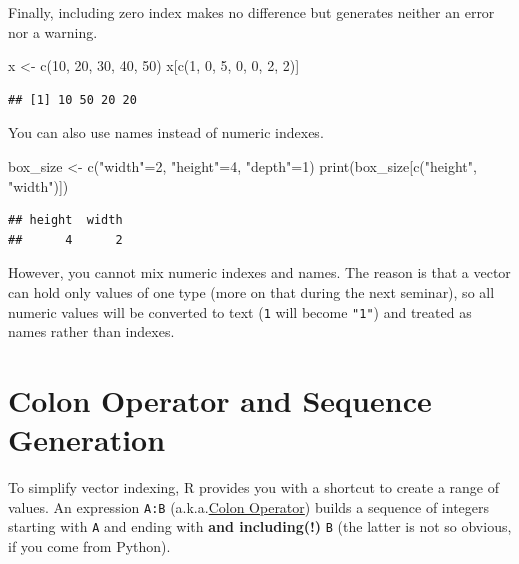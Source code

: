 \documentclass[
]{book}
\newenvironment{Shaded}{\begin{snugshade}}{\end{snugshade}}
\newcommand{\DecValTok}[1]{\textcolor[rgb]{0.00,0.00,0.81}{#1}}
\newcommand{\FunctionTok}[1]{\textcolor[rgb]{0.00,0.00,0.00}{#1}}
\newcommand{\NormalTok}[1]{#1}
\newcommand{\OtherTok}[1]{\textcolor[rgb]{0.56,0.35,0.01}{#1}}
\newcommand{\StringTok}[1]{\textcolor[rgb]{0.31,0.60,0.02}{#1}}
\begin{document}
Finally, including zero index makes no difference but generates neither an error nor a warning.

\begin{Shaded}
\begin{Highlighting}[]
\NormalTok{x }\OtherTok{\textless{}{-}} \FunctionTok{c}\NormalTok{(}\DecValTok{10}\NormalTok{, }\DecValTok{20}\NormalTok{, }\DecValTok{30}\NormalTok{, }\DecValTok{40}\NormalTok{, }\DecValTok{50}\NormalTok{)}
\NormalTok{x[}\FunctionTok{c}\NormalTok{(}\DecValTok{1}\NormalTok{, }\DecValTok{0}\NormalTok{, }\DecValTok{5}\NormalTok{, }\DecValTok{0}\NormalTok{, }\DecValTok{0}\NormalTok{, }\DecValTok{2}\NormalTok{, }\DecValTok{2}\NormalTok{)]}
\end{Highlighting}
\end{Shaded}

\begin{verbatim}
## [1] 10 50 20 20
\end{verbatim}

You can also use names instead of numeric indexes.

\begin{Shaded}
\begin{Highlighting}[]
\NormalTok{box\_size }\OtherTok{\textless{}{-}} \FunctionTok{c}\NormalTok{(}\StringTok{"width"}\OtherTok{=}\DecValTok{2}\NormalTok{, }\StringTok{"height"}\OtherTok{=}\DecValTok{4}\NormalTok{, }\StringTok{"depth"}\OtherTok{=}\DecValTok{1}\NormalTok{) }
\FunctionTok{print}\NormalTok{(box\_size[}\FunctionTok{c}\NormalTok{(}\StringTok{"height"}\NormalTok{, }\StringTok{"width"}\NormalTok{)])}
\end{Highlighting}
\end{Shaded}

\begin{verbatim}
## height  width 
##      4      2
\end{verbatim}

However, you cannot mix numeric indexes and names. The reason is that a vector can hold only values of one type (more on that during the next seminar), so all numeric values will be converted to text (\texttt{1} will become \texttt{"1"}) and treated as names rather than indexes.

\hypertarget{colon-sequence}{%
\section{Colon Operator and Sequence Generation}\label{colon-sequence}}

To simplify vector indexing, R provides you with a shortcut to create a range of values. An expression \texttt{A:B} (a.k.a.\href{https://stat.ethz.ch/R-manual/R-devel/library/base/html/Colon.html}{Colon Operator}) builds a sequence of integers starting with \texttt{A} and ending with \textbf{and including(!)} \texttt{B} (the latter is not so obvious, if you come from Python).
\end{document}
